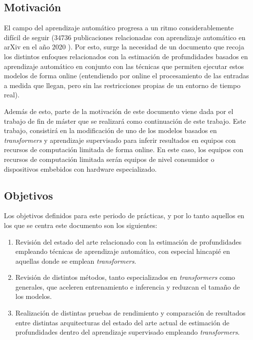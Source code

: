 \documentclass[a4paper]{article}
\begin{document}
\subsection{Motivación}
El campo del aprendizaje automático progresa a un ritmo considerablemente difícil de seguir (34736 publicaciones relacionadas con aprendizaje automático en arXiv en el año 2020 \cite{ai_index_report_2021}). Por esto, surge la necesidad de un documento que recoja los distintos enfoques relacionados con la estimación de profundidades basados en aprendizaje automático en conjunto con las técnicas que permiten ejecutar estos modelos de forma online (entendiendo por online el procesamiento de las entradas a medida que llegan, pero sin las restricciones propias de un entorno de tiempo real).

Además de esto, parte de la motivación de este documento viene dada por el trabajo de fin de máster que se realizará como continuación de este trabajo. Este trabajo, consistirá en la modificación de uno de los modelos basados en \textit{transformers} y aprendizaje supervisado para inferir resultados en equipos con recursos de computación limitada de forma online. En este caso, los equipos con recursos de computación limitada serán equipos de nivel consumidor o dispositivos embebidos con hardware especializado.


\subsection{Objetivos}
Los objetivos definidos para este periodo de prácticas, y por lo tanto aquellos en los que se centra este documento son los siguientes:
\begin{enumerate}
    \item Revisión del estado del arte relacionado con la estimación de profundidades empleando técnicas de aprendizaje automático, con especial hincapié en aquellas donde se emplean \textit{transformers}.
    \item Revisión de distintos métodos, tanto especializados en \textit{transformers} como generales, que aceleren entrenamiento e inferencia y reduzcan el tamaño de los modelos.
    \item Realización de distintas pruebas de rendimiento y comparación de resultados entre distintas arquitecturas del estado del arte actual de estimación de profundidades dentro del aprendizaje supervisado empleando \textit{transformers}.
\end{enumerate}
\end{document}
